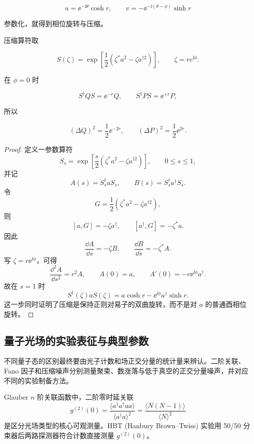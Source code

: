\[
u=\ee^{-\ii\theta}\cosh r,
\qquad
v=-\ee^{-\ii(\theta-\phi)}\sinh r
\]

参数化，就得到相位旋转与压缩。

压缩算符取

\[
S(\zeta)
=\exp\!\left[
\frac12(\zeta^*a^2-\zeta a^{\dagger2})
\right],
\qquad \zeta=re^{\ii\phi}.
\]

在 \(\phi=0\) 时

\[
S^\dagger QS=\ee^{-r}Q,
\qquad
S^\dagger PS=\ee^{+r}P,
\]

所以

\[
(\Delta Q)^2=\frac12\ee^{-2r},
\qquad
(\Delta P)^2=\frac12\ee^{2r}.
\]

\begin{proof}
定义一参数算符
\[
S_s=\exp\left[\frac{s}{2}(\zeta^*a^2-\zeta a^{\dagger2})\right],
\qquad 0\le s\le1,
\]
并记
\[
A(s)=S_s^\dagger aS_s,
\qquad
B(s)=S_s^\dagger a^\dagger S_s.
\]
令
\[
G=\frac12(\zeta^*a^2-\zeta a^{\dagger2}),
\]
则
\[
[a,G]=-\zeta a^\dagger,
\qquad
[a^\dagger,G]=-\zeta^*a.
\]
因此
\[
\frac{\dd A}{\dd s}=-\zeta B,
\qquad
\frac{\dd B}{\dd s}=-\zeta^*A.
\]
写 \(\zeta=r\ee^{\ii\phi}\)，可得
\[
\frac{\dd^2A}{\dd s^2}=r^2A,
\qquad
A(0)=a,
\qquad
A'(0)=-r\ee^{\ii\phi}a^\dagger.
\]
故在 \(s=1\) 时
\begin{equation}
S^\dagger(\zeta)aS(\zeta)
=a\cosh r-\ee^{\ii\phi}a^\dagger\sinh r.
\label{eq:squeezing-bogoliubov-transform}
\end{equation}
这一步同时证明了压缩是保持正则对易子的双曲旋转，而不是对 \(a\) 的普通酉相位旋转。
\end{proof}



\subsection{量子光场的实验表征与典型参数}\label{sec:quantum-optics-experiments}

不同量子态的区别最终要由光子计数和场正交分量的统计量来辨认。二阶关联、Fano 因子和压缩噪声分别测量聚束、数涨落与低于真空的正交分量噪声，并对应不同的实验制备方法。

Glauber \(n\) 阶关联函数中，二阶零时延关联
\[
g^{(2)}(0)=\frac{\langle a^\dagger a^\dagger aa\rangle}{\langle a^\dagger a\rangle^2}
=\frac{\langle N(N-1)\rangle}{\langle N\rangle^2}
\]
是区分光场类型的核心可观测量。HBT (Hanbury Brown--Twiss) 实验用 50/50 分束器后两路探测器符合计数直接测量 \(g^{(2)}(0)\)。

